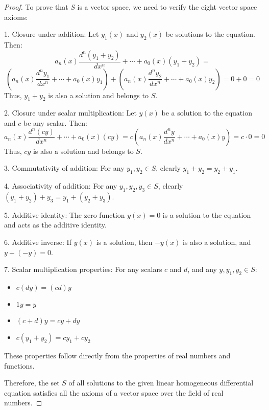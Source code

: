 \begin{proof}
To prove that $S$ is a vector space, we need to verify the eight vector space axioms:

1. Closure under addition: Let $y_1(x)$ and $y_2(x)$ be solutions to the equation. Then:
   \[
   a_n(x)\frac{d^n(y_1+y_2)}{dx^n} + \cdots + a_0(x)(y_1+y_2) = 
   \]
   \[
   \left(a_n(x)\frac{d^ny_1}{dx^n} + \cdots + a_0(x)y_1\right) + 
   \left(a_n(x)\frac{d^ny_2}{dx^n} + \cdots + a_0(x)y_2\right) = 0 + 0 = 0
   \]
   Thus, $y_1 + y_2$ is also a solution and belongs to $S$.

2. Closure under scalar multiplication: Let $y(x)$ be a solution to the equation and $c$ be any scalar. Then:
   \[
   a_n(x)\frac{d^n(cy)}{dx^n} + \cdots + a_0(x)(cy) = 
   c\left(a_n(x)\frac{d^ny}{dx^n} + \cdots + a_0(x)y\right) = c \cdot 0 = 0
   \]
   Thus, $cy$ is also a solution and belongs to $S$.

3. Commutativity of addition: For any $y_1, y_2 \in S$, clearly $y_1 + y_2 = y_2 + y_1$.

4. Associativity of addition: For any $y_1, y_2, y_3 \in S$, clearly $(y_1 + y_2) + y_3 = y_1 + (y_2 + y_3)$.

5. Additive identity: The zero function $y(x) = 0$ is a solution to the equation and acts as the additive identity.

6. Additive inverse: If $y(x)$ is a solution, then $-y(x)$ is also a solution, and $y + (-y) = 0$.

7. Scalar multiplication properties: For any scalars $c$ and $d$, and any $y, y_1, y_2 \in S$:
   \begin{itemize}
   \item $c(dy) = (cd)y$
   \item $1y = y$
   \item $(c+d)y = cy + dy$
   \item $c(y_1 + y_2) = cy_1 + cy_2$
   \end{itemize}
   These properties follow directly from the properties of real numbers and functions.

Therefore, the set $S$ of all solutions to the given linear homogeneous differential equation satisfies all the axioms of a vector space over the field of real numbers.
\end{proof}

